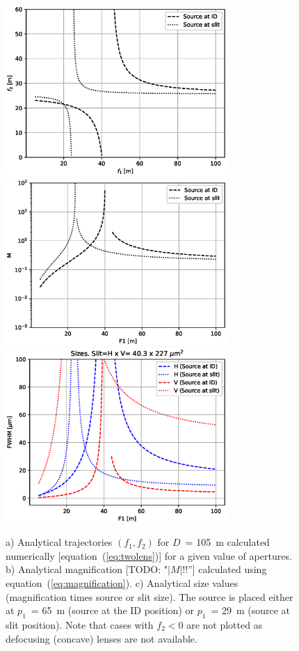\documentclass{iucr}              %
\newcommand{\todo}[1]{{\color{red}[TODO: "#1'']}}
\begin{document}
\begin{figure}\label{fig:analytical}
    \centering

    \includegraphics[width=0.75\textwidth]{figures/f1f2_analytical.eps}
    \includegraphics[width=0.75\textwidth]{figures/magnification_analytical.eps}
    \includegraphics[width=0.75\textwidth]{figures/sizes_analytical.eps}

    \caption{a) Analytical trajectories $(f_1,f_2)$ for $D$~= \SI{105}{\meter} calculated numerically [equation~(\ref{eq:twolens})] for a given value of apertures.
    b) 
    Analytical magnification \todo{$|M|$!!} calculated using equation~(\ref{eq:magnification}).
    c) 
    Analytical size values (magnification times source or slit size).
    The source is placed either at $p_1$~= \SI{65}{\meter} (source at the ID position) or $p_1$~= \SI{29}{\meter} (source at slit position). Note that cases with $f_2<0$ are not plotted as defocusing (concave) lenses are not available. 
    }
\end{figure}
\end{document}
